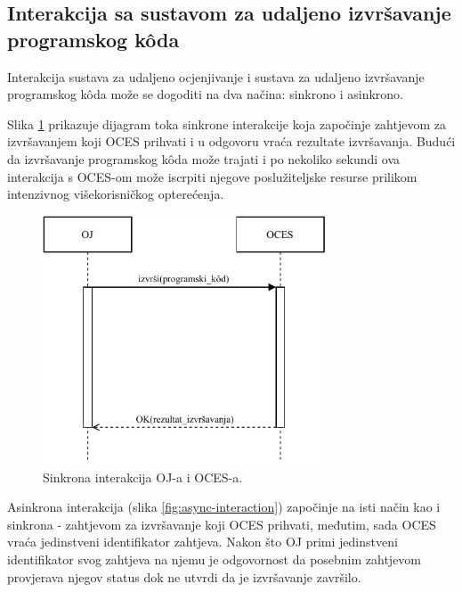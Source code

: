 \documentclass[times, utf8, diplomski]{fer}
\begin{document}
\subsection{Interakcija sa sustavom za udaljeno izvršavanje programskog kôda}
\label{subsec:interaction}
Interakcija sustava za udaljeno ocjenjivanje i sustava za udaljeno izvršavanje programskog kôda može se dogoditi na dva načina: sinkrono i asinkrono.

Slika \ref{fig:sync-interaction} prikazuje dijagram toka sinkrone interakcije koja započinje zahtjevom za izvršavanjem koji OCES prihvati i u odgovoru vraća rezultate izvršavanja. Budući da izvršavanje programskog kôda može trajati i po nekoliko sekundi ova interakcija s OCES-om može iscrpiti njegove poslužiteljske resurse prilikom intenzivnog višekorisničkog opterećenja.

\begin{figure}[htb]
	\centering
	\includegraphics[width=0.75\textwidth]{images/Sync Interakcija.pdf}
	\caption{
		Sinkrona interakcija OJ-a i OCES-a.
	}
	\label{fig:sync-interaction}
\end{figure}

Asinkrona interakcija (slika \ref{fig:async-interaction}) započinje na isti način kao i sinkrona - zahtjevom za izvršavanje koji OCES prihvati, međutim, sada OCES vraća jedinstveni identifikator zahtjeva. Nakon što OJ primi jedinstveni identifikator svog zahtjeva na njemu je odgovornost da posebnim zahtjevom provjerava njegov status dok ne utvrdi da je izvršavanje završilo.
\end{document}
